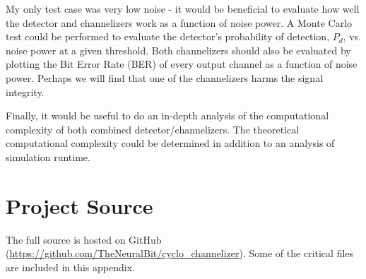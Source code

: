 \documentclass[12pt]{report}
\begin{document}
My only test case was very low noise - it would be beneficial to evaluate
how well the detector and channelizers work as a function of noise power. A Monte
Carlo test could be performed to evaluate the detector's probability of
detection, $P_d$, vs. noise power at a given threshold. Both channelizers should also be evaluated by plotting the Bit Error Rate (BER) of every output channel as a function of noise power. Perhaps we will find that one of the channelizers harms the signal integrity.

Finally, it would be useful to do an in-depth analysis of the computational
complexity of both combined detector/channelizers. The theoretical
computational complexity could be determined in addition to an analysis of
simulation runtime.


%
%

%



\nocite{*}


%

\appendix

\chapter{Project Source}
\label{sec:source}
The full source is hosted on GitHub
(\url{https://github.com/TheNeuralBit/cyclo\_channelizer}). Some of the
critical files are included in this appendix.
\end{document}
